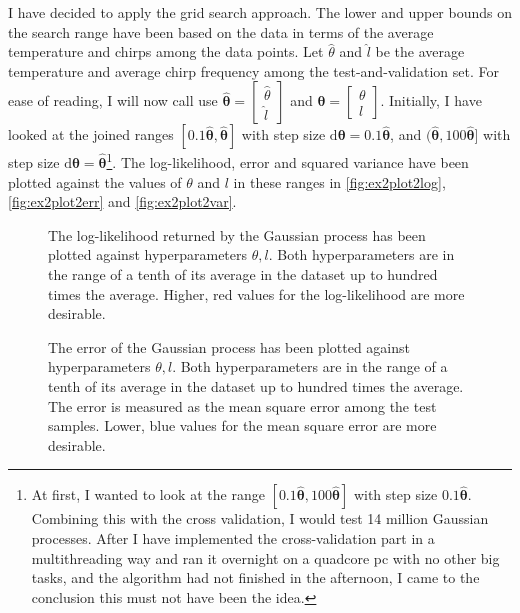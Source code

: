 \documentclass[a4paper,11pt]{article}
\newcommand{\V}[1]{\ensuremath{\boldsymbol{#1}}}
\newcommand{\dif}{\ensuremath{\mathrm{d}}}
\begin{document}
I have decided to apply the grid search approach.  The lower and upper bounds on the search range have been based on the data in terms of the average temperature and chirps among the data points.  Let $\hat\theta$ and $\hat l$ be the average temperature and average chirp frequency among the test-and-validation set.  For ease of reading, I will now call use $\V{\hat\theta} = \begin{bmatrix}\hat\theta\\\hat l\end{bmatrix}$ and $\V{\theta} = \begin{bmatrix}\theta\\l\end{bmatrix}$.  Initially, I have looked at the joined ranges $[0.1\V{\hat\theta}, \V{\hat\theta}]$ with step size $\dif \V{\theta} = 0.1\V{\hat\theta}$, and $(\V{\hat\theta}, 100 \V{\hat\theta}]$ with step size $\dif \V{\theta} = \V{\hat\theta}$\footnote{At first, I wanted to look at the range $[0.1\V{\hat\theta}, 100\V{\hat\theta}]$ with step size $0.1\V{\hat\theta}$. Combining this with the cross validation, I would test 14 million Gaussian processes.  After I have implemented the cross-validation part in a multithreading way and ran it overnight on a quadcore pc with no other big tasks, and the algorithm had not finished in the afternoon, I came to the conclusion this must not have been the idea.}.  The log-likelihood, error and squared variance have been plotted against the values of $\theta$ and $l$ in these ranges in \autoref{fig:ex2plot2log}, \autoref{fig:ex2plot2err} and \autoref{fig:ex2plot2var}.


\begin{figure}
  \begin{center}
    \caption{The log-likelihood returned by the Gaussian process has been plotted against hyperparameters $\theta, l$.  Both hyperparameters are in the range of a tenth of its average in the dataset up to hundred times the average.  Higher, red values for the log-likelihood are more desirable.}
    \label{fig:ex2plot2log}
  \end{center}
\end{figure}


\begin{figure}
  \begin{center}
    \caption{The error of the Gaussian process has been plotted against hyperparameters $\theta, l$.  Both hyperparameters are in the range of a tenth of its average in the dataset up to hundred times the average.  The error is measured as the mean square error among the test samples.  Lower, blue values for the mean square error are more desirable.}
    \label{fig:ex2plot2err}
  \end{center}
\end{figure}
\end{document}
